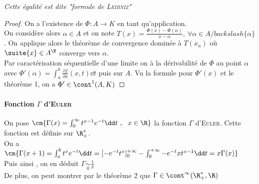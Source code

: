 		\textit{Cette égalité est dite "formule de \textsc{Leibniz}"}
		\begin{proof}
		On a l'existence de $\Phi :A\to K$ en tant qu'application.\\
		On considère alors $\alpha \in A$ et on note $T(x) = \frac{\Phi(x)-\Phi(\alpha)}{x-\alpha} ,~\forall \alpha\in A/backslash \{\alpha\}$. On applique alors le théorème de convergence dominée à $T(x_n)$ où $\suite{x} \in A^\N$ converge vers $\alpha$.\\
		Par caractérisation séquentielle d'une limite on à la dérivabilité de $\Phi$ au point $\alpha$ avec $\Phi'(\alpha) = \int_a^b \frac{\partial f}{\partial x} (x,t) \dd t$ puis sur $A$. 
		Vu la formule pour $\Phi'(x)$ et le théorème 1, on a $\Phi'\in\cont^1(A,K)$
		\end{proof}
	\paragraph{Fonction $\Gamma$ d'\textsc{Euler}}
		On pose $\cm{\Gamma(x) = \int_0^{\infty} t^{x-1}e^{-t} \dd t ~,~~x\in\R}$ la fonction $\Gamma$ d'\textsc{Euler}. Cette fonction est définie sur $\R_+^*$.\\
		On a $\cm{\Gamma(x+1) = \int_a^b t^xe^{-t}\dd t = [-e^{-t}t^x]_0^{+\infty} - \int_0^{+\infty} -e^{-t}xt^{x-1} \dd t = x\Gamma(x) }$\\
		Puis ainsi  , on en déduit $\Gamma \underset{0}{\sim} \frac{1}{x}$\\
		De plus, on peut montrer par le théorème 2 que $\Gamma\in\cont^{\infty}(\R_+^*,\R)$ \vspace*{0.5cm} \\ 
		\begin{center}
		\fin
		\end{center}